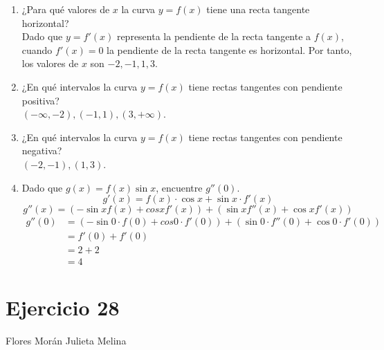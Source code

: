 \documentclass[12pt]{article}
\begin{document}
\begin{enumerate}[label=(\alph*)]
\item ¿Para qué valores de $x$ la curva $y = f(x)$ tiene una recta tangente horizontal?\\
  Dado que $y=f'(x)$ representa la pendiente de la recta tangente a $f(x)$, cuando $f'(x)=0$ la pendiente de la recta tangente es horizontal. Por tanto, los valores de $x$ son $-2,-1,1,3$.

\item ¿En qué intervalos la curva $y = f(x)$ tiene rectas tangentes con pendiente positiva?\\
  $(-\infty,-2),(-1,1),(3,+\infty)$.

\item ¿En qué intervalos la curva $y = f(x)$ tiene rectas tangentes con pendiente negativa?\\
  $(-2,-1), (1,3)$.

\item Dado que $g(x) = f(x) \sin x$, encuentre $g''(0)$.
  $$g'(x)=f(x)\cdot \cos x + \sin x \cdot f'(x)$$
  $$g''(x)=(-\sin xf(x) + cosxf'(x)) + (\sin xf''(x)+\cos xf'(x))$$
  \begin{equation*}
    \begin{split}
      g''(0)
      &= (-\sin 0 \cdot f(0) + cos0\cdot f'(0)) + (\sin 0\cdot f''(0)+\cos 0\cdot f'(0))\\
      &= f'(0) + f'(0) \\
      &= 2+2\\
      &=4
    \end{split}
  \end{equation*}
  
\end{enumerate}

\section{Ejercicio 28} Flores Morán Julieta Melina \\
\end{document}
